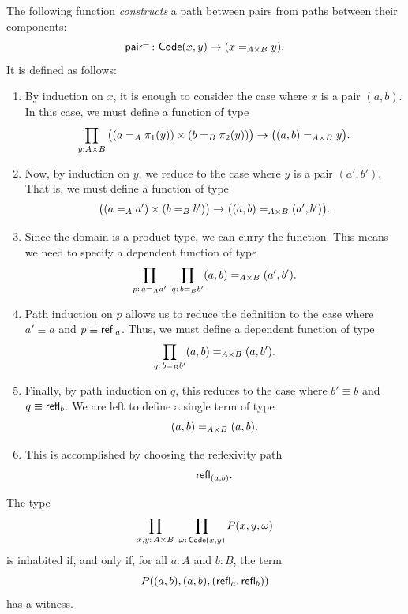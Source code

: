 The following function \textit{constructs} a path between pairs from paths between their components:
\[
    \fun{pair}^{\eq{}}\colon\fun{Code}(x,y)\to (x\eq{A\times B}y).
\]
It is defined as follows:
\begin{enumerate}[-]
    \item By induction on\/ $x$, it is enough to consider the case where\/ $x$ is a pair\/ $(a,b)$. In this case, we must define a function of type
    \[
        \prod_{y:A\times B}
            \big(
            (a\mathrel{=_{A}}\mathsf{\pi}_1(y))\times(b\mathrel{=_{B}}\mathsf{\pi}_2(y)) 
            \big)
            \to\big((a,b)\mathrel{=_{A\times B}}y\big).
    \]
    \item Now, by induction on\/ $y$, we reduce to the case where\/ $y$ is a pair\/ $(a',b')$. That is, we must define a function of type
    \[
        \big((a\mathrel{=_{A}}a')\times(b\mathrel{=_{B}}b')\big)
        \to\big((a,b)\mathrel{=_{A\times B}}(a',b')\big).
    \]
    \item Since the domain is a product type, we can curry the function. This means we need to specify a dependent function of type
    \[
        \prod_{p\colon a\eq Aa'}\;
        \prod_{q\colon b\eq Bb'}
            (a,b)\eq{A\times B}(a',b').
    \]
    \item Path induction on\/ $p$ allows us to reduce the definition to the case where\/ $a'\equiv a$ and\/ $p\equiv \mathsf{refl}_a$. Thus, we must define a dependent function of type
    \[
        \prod_{q\colon b\eq Bb'}(a,b)\eq{A\times B}(a,b').
    \]
    \item Finally, by path induction on\/ $q$, this reduces to the case where\/ $b'\equiv b$ and\/ $q\equiv\mathsf{refl}_b$. We are left to define a single term of type
    \[
        (a,b)\mathrel{=_{A\times B}}(a,b).
    \]
    \item This is accomplished by choosing the reflexivity path
    \[
        \mathsf{refl}_{(a,b)}.
    \]
\end{enumerate}

\begin{lem}\label{lem:AxB-goal-reduction}
    The type
    \[
        \prod_{x,y\colon A\times B}\;
        \prod_{\omega\colon\fun{Code}(x,y)}
        P(x,y,\omega)
    \]
    is inhabited if, and only if, for all\/ $a\colon A$ and\/ $b\colon B$, the term
    \[
        P((a,b),(a,b),(\mathsf{refl}_a,\mathsf{refl}_b))
    \]
    has a witness.
\end{lem}

